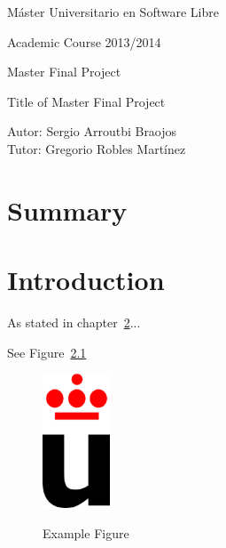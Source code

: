 \documentclass[a4paper, 12pt]{book}
\begin{document}
\begin{titlepage}
\begin{center}
\vspace{3cm}

\Large
Máster Universitario en Software Libre

\vspace{0.4cm}

\large
Academic Course 2013/2014

\vspace{0.8cm}

Master Final Project

\vspace{2.5cm}

\LARGE
Title of Master Final Project

\vspace{4cm}

\large
Autor: Sergio Arroutbi Braojos \\
Tutor: Gregorio Robles Martínez
\end{center}
\end{titlepage}

\tableofcontents

\listoffigures

\listoftables


\chapter{Summary}
\label{chap:summary}




\chapter{Introduction}
\label{chap:intro}

As stated in chapter~\ref{chap:intro}...

See Figure~\ref{fig:logo}

\begin{figure}[h!]
  \centering
  \includegraphics[width=2cm, keepaspectratio]{img/logo_vect.eps}
  \label{fig:logo}
  \caption{Example Figure}
\end{figure}
\end{document}
